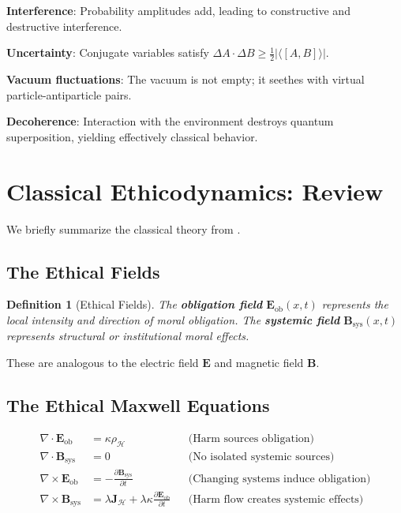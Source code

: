 \documentclass[12pt]{article}
\newtheorem{definition}{Definition}[section]
\begin{document}
\textbf{Interference}: Probability amplitudes add, leading to constructive and destructive interference.

\textbf{Uncertainty}: Conjugate variables satisfy $\Delta A \cdot \Delta B \geq \frac{1}{2} |\langle [A,B] \rangle|$.

\textbf{Vacuum fluctuations}: The vacuum is not empty; it seethes with virtual particle-antiparticle pairs.

\textbf{Decoherence}: Interaction with the environment destroys quantum superposition, yielding effectively classical behavior.

\section{Classical Ethicodynamics: Review}

We briefly summarize the classical theory from \cite{bond2025noether}.

\subsection{The Ethical Fields}

\begin{definition}[Ethical Fields]
The \textbf{obligation field} $\mathbf{E}_{\mathrm{ob}}(x,t)$ represents the local intensity and direction of moral obligation. The \textbf{systemic field} $\mathbf{B}_{\mathrm{sys}}(x,t)$ represents structural or institutional moral effects.
\end{definition}

These are analogous to the electric field $\mathbf{E}$ and magnetic field $\mathbf{B}$.

\subsection{The Ethical Maxwell Equations}

\begin{align}
    \nabla \cdot \mathbf{E}_{\mathrm{ob}} &= \kappa \rho_{\mathcal{H}} & &\text{(Harm sources obligation)} \\
    \nabla \cdot \mathbf{B}_{\mathrm{sys}} &= 0 & &\text{(No isolated systemic sources)} \\
    \nabla \times \mathbf{E}_{\mathrm{ob}} &= -\frac{\partial \mathbf{B}_{\mathrm{sys}}}{\partial t} & &\text{(Changing systems induce obligation)} \\
    \nabla \times \mathbf{B}_{\mathrm{sys}} &= \lambda \mathbf{J}_{\mathcal{H}} + \lambda\kappa \frac{\partial \mathbf{E}_{\mathrm{ob}}}{\partial t} & &\text{(Harm flow creates systemic effects)}
\end{align}
\end{document}
